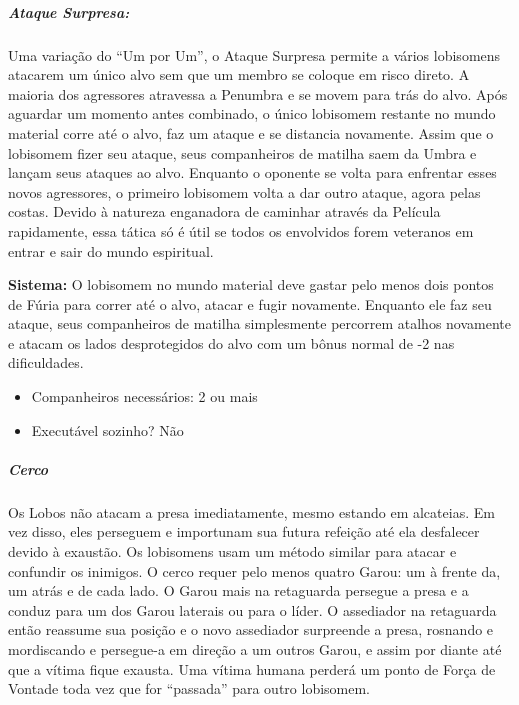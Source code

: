 \begin{multicols}{2}
\subparagraph{\textbf{Ataque Surpresa:}}
Uma variação do “Um por Um”, o Ataque Surpresa permite a vários lobisomens atacarem um único alvo sem que um membro se coloque em risco direto. A maioria dos agressores atravessa a Penumbra e se movem para trás do alvo. Após aguardar um momento antes combinado, o único lobisomem restante no mundo material corre até o alvo, faz um ataque e se distancia novamente. Assim que o lobisomem fizer seu ataque, seus companheiros de matilha saem da Umbra e lançam seus ataques ao alvo. Enquanto o oponente se volta para enfrentar esses novos agressores, o primeiro lobisomem volta a dar outro ataque, agora pelas costas. Devido à natureza enganadora de caminhar através da Película rapidamente, essa tática só é útil se todos os envolvidos forem veteranos em entrar e sair do mundo espiritual.

\textbf{Sistema:} O lobisomem no mundo material deve gastar pelo menos dois pontos de Fúria para correr até o alvo, atacar e fugir novamente. Enquanto ele faz seu ataque, seus companheiros de matilha simplesmente percorrem atalhos novamente e atacam os lados desprotegidos do alvo com um bônus normal de -2 nas dificuldades.
\begin{itemize}[noitemsep]
\item Companheiros necessários: 2 ou mais
\item Executável sozinho? Não
\end{itemize}

\subparagraph{\textbf{Cerco}}
Os Lobos não atacam a presa imediatamente, mesmo estando em alcateias. Em vez disso, eles perseguem e importunam sua futura refeição até ela desfalecer devido à exaustão. Os lobisomens usam um método similar para atacar e confundir os inimigos.
O cerco requer pelo menos quatro Garou: um à frente da, um atrás e de cada lado. O Garou mais na retaguarda persegue a presa e a conduz para um dos Garou laterais ou para o líder. O assediador na retaguarda então reassume sua posição e o novo assediador surpreende a presa, rosnando e mordiscando e persegue-a   em direção a um outros Garou, e assim por diante até que a vítima fique exausta. Uma vítima humana perderá um ponto de Força de Vontade toda vez que for “passada” para outro lobisomem.


\end{multicols}
